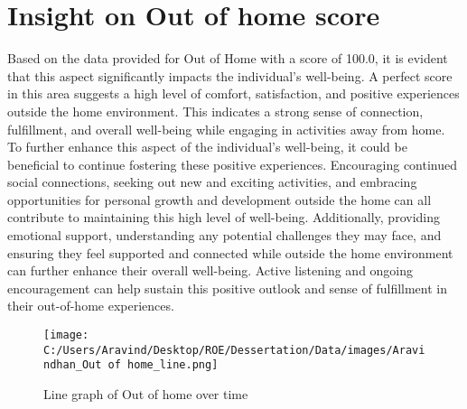 \documentclass[10pt, a4paper]{article}%
\begin{document}
%
\section{Insight on Out of home score}%
\label{sec:InsightonOutofhomescore}%
Based on the data provided for Out of Home with a score of 100.0, it is evident that this aspect significantly impacts the individual's well{-}being. A perfect score in this area suggests a high level of comfort, satisfaction, and positive experiences outside the home environment. This indicates a strong sense of connection, fulfillment, and overall well{-}being while engaging in activities away from home.\newline%
\newline%
To further enhance this aspect of the individual's well{-}being, it could be beneficial to continue fostering these positive experiences. Encouraging continued social connections, seeking out new and exciting activities, and embracing opportunities for personal growth and development outside the home can all contribute to maintaining this high level of well{-}being.\newline%
\newline%
Additionally, providing emotional support, understanding any potential challenges they may face, and ensuring they feel supported and connected while outside the home environment can further enhance their overall well{-}being. Active listening and ongoing encouragement can help sustain this positive outlook and sense of fulfillment in their out{-}of{-}home experiences.%


\begin{figure}[H]%
\centering%
\texttt{[image: C:/Users/Aravind/Desktop/ROE/Dessertation/Data/images/Aravindhan\_Out of home\_line.png]}%
\caption{Line graph of Out of home over time}%
\end{figure}

%
\end{document}
